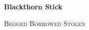 \documentclass[letterpaper,12pt]{article}
\begin{document}
\begin{center}
    {\fontsize{24pt}{24pt}\textbf{Blackthorn Stick}}\\
\end{center}

\begin{flushright}
    \textsc{Begged Borrowed Stolen}
\end{flushright}

\end{document}
